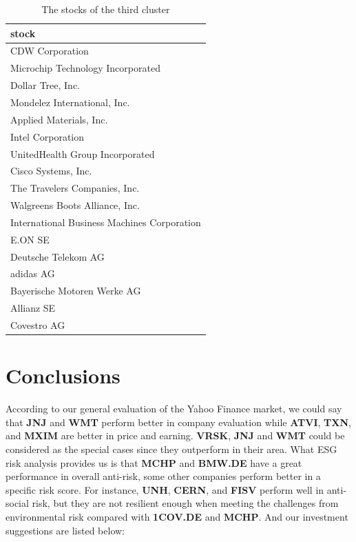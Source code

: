 \documentclass[11pt,a4paper,]{article}
\begin{document}
\begin{table}

\caption{\label{tab:memb-three}The stocks of the third cluster}
\centering
\begin{tabular}[t]{l}
\hline
stock\\
\hline
CDW Corporation\\
\hline
Microchip Technology Incorporated\\
\hline
Dollar Tree, Inc.\\
\hline
Mondelez International, Inc.\\
\hline
Applied Materials, Inc.\\
\hline
Intel Corporation\\
\hline
UnitedHealth Group Incorporated\\
\hline
Cisco Systems, Inc.\\
\hline
The Travelers Companies, Inc.\\
\hline
Walgreens Boots Alliance, Inc.\\
\hline
International Business Machines Corporation\\
\hline
E.ON SE\\
\hline
Deutsche Telekom AG\\
\hline
adidas AG\\
\hline
Bayerische Motoren Werke AG\\
\hline
Allianz SE\\
\hline
Covestro AG\\
\hline
\end{tabular}
\end{table}

\clearpage

\hypertarget{conclusions}{%
\section{Conclusions}\label{conclusions}}

According to our general evaluation of the Yahoo Finance market, we could say that \textbf{JNJ} and \textbf{WMT} perform better in company evaluation while \textbf{ATVI}, \textbf{TXN}, and \textbf{MXIM} are better in price and earning. \textbf{VRSK}, \textbf{JNJ} and \textbf{WMT} could be considered as the special cases since they outperform in their area. What ESG risk analysis provides us is that \textbf{MCHP} and \textbf{BMW.DE} have a great performance in overall anti-risk, some other companies perform better in a specific risk score. For instance, \textbf{UNH}, \textbf{CERN}, and \textbf{FISV} perform well in anti-social risk, but they are not resilient enough when meeting the challenges from environmental risk compared with \textbf{1COV.DE} and \textbf{MCHP}. And our investment suggestions are listed below:
\end{document}
